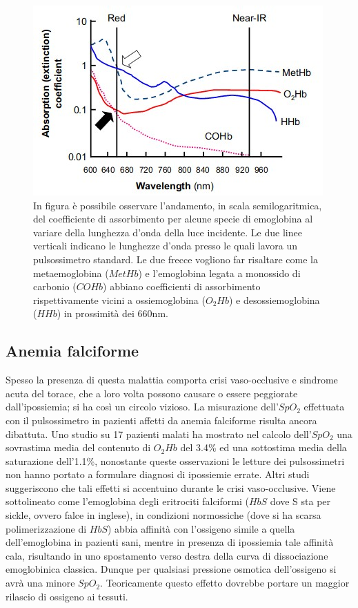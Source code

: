 \documentclass[12pt,a4paper, twoside, openright]{report}
\begin{document}
\begin{figure}[h!]
    \centering
    \includegraphics[width=\textwidth]{multidiss.jpg}
    \caption{In figura è possibile osservare l'andamento, in scala semilogaritmica, del 			 coefficiente di assorbimento per alcune specie di emoglobina al variare 					 della lunghezza d'onda della luce incidente. 
  		     Le due linee verticali indicano le lunghezze d'onda presso le quali lavora 			 un pulsossimetro standard. 
 		     Le due frecce vogliono far risaltare come la metaemoglobina ($MetHb$) e 					 l'emoglobina legata a monossido di carbonio ($COHb$) abbiano coefficienti 					 di assorbimento rispettivamente vicini a ossiemoglobina ($O_2Hb$) e 						 desossiemoglobina ($HHb$) in prossimità dei 660nm.} 
    \label{fig:multidissociation}
\end{figure}


\subsection{Anemia falciforme}

Spesso la presenza di questa malattia comporta crisi vaso-occlusive e sindrome acuta del torace, che a loro volta possono causare o essere peggiorate dall'ipossiemia; si ha così un circolo vizioso. 
La misurazione dell'$SpO_2$ effettuata con il pulsossimetro in pazienti affetti da anemia falciforme risulta ancora dibattuta. 
Uno studio su 17 pazienti malati ha mostrato nel calcolo dell'$SpO_2$ una sovrastima media del contenuto di $O_2Hb$ del 3.4\% ed una sottostima media della saturazione dell'1.1\%, nonostante queste osservazioni le letture dei pulsossimetri non hanno portato a formulare diagnosi di ipossiemie errate.%
Altri studi suggeriscono che tali effetti si accentuino durante le crisi vaso-occlusive. 
Viene sottolineato come l'emoglobina degli eritrociti falciformi ($HbS$ dove S sta per sickle, ovvero falce in inglese), in condizioni normossiche (dove si ha scarsa polimerizzazione di $HbS$) abbia affinità con l'ossigeno simile a quella dell'emoglobina in pazienti sani, mentre in presenza di ipossiemia tale affinità cala, risultando in uno spostamento verso destra della curva di dissociazione emoglobinica classica. 
Dunque per qualsiasi pressione osmotica dell'ossigeno si avrà una minore $SpO_2$. Teoricamente questo effetto dovrebbe portare un maggior rilascio di ossigeno ai tessuti.
\end{document}
